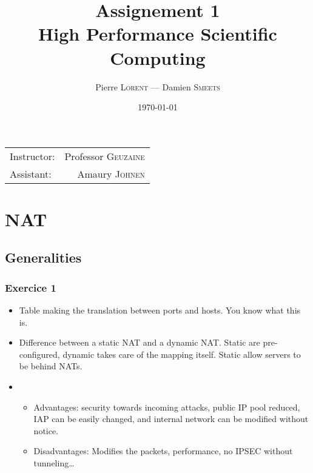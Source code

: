 \documentclass{article}
\title{Assignement 1 \\ High Performance Scientific Computing} %
\author{Pierre \textsc{Lorent} — Damien \textsc{Smeets}} %
\date{\today} %
\begin{document}
\maketitle %

\begin{center}
\begin{tabular}{l r}
Instructor: & Professor \textsc{Geuzaine}\\ %
Assistant: & Amaury \textsc{Johnen}
\end{tabular}
\end{center}

\section{NAT}
\subsection{Generalities}
\subsubsection*{Exercice 1}
\begin{itemize}
\item Table making the translation between ports and hosts. You know what this is.
\item Difference between a static NAT and a dynamic NAT. Static are pre-configured, dynamic takes care of the mapping itself. Static allow servers to be behind NATs.
\item \begin{itemize}\item Advantages: security towards incoming attacks, public IP pool reduced, IAP can be easily changed, and internal network can be modified without notice.
\item Disadvantages: Modifies the packets, performance, no IPSEC without tunneling…\end{itemize}
\end{itemize}
\end{document}
